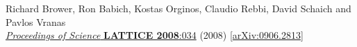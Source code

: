 \begin{spacelist}
\begin{revnumerate}
      Richard Brower, Ron Babich, Kostas Orginos, Claudio Rebbi, David Schaich and Pavlos Vranas \\
      \href{https://doi.org/10.22323/1.066.0034}{\textit{Proceedings of Science} \textbf{LATTICE 2008}:034} (2008) [\href{http://arxiv.org/abs/0906.2813}{arXiv:0906.2813}]
  \end{revnumerate}
%
%
%
\begin{comment} %
\vspace{20 pt} {\large \bfseries In active preparation} \hfill(ordered by anticipated completion)
  \pagebreakitem
    \optem{Nonperturbative ingredients for stochastic gravitational wave predictions} \\
    Venkitesh Ayyar, Ethan T.~Neil, Enrico Rinaldi and David Schaich \\
  \pagebreakitem
    \optem{Plane wave matrix model at finite temperatures on the lattice} \\
    Raghav G.~Jha, Anosh Joseph and David Schaich \\
  \pagebreakitem
    \optem{Improved parallel software for lattice supersymmetry} \\
    David Schaich, Georg Bergner, Simon Catterall, Raghav G.~Jha and Anosh Joseph \\
  \pagebreakitem
    \optem{Tests of the twelve-flavor beta function with staggered fermions} \\
    Anna Hasenfratz and David Schaich \\
  \pagebreakitem
    \optem{Lattice calculations of the $\mathcal N = 4$ supersymmetric Yang--Mills static potential} \\
    Simon Catterall, Poul H.~Damgaard, Joel Giedt, Raghav G.~Jha and David Schaich
  \pagebreakitem
    \optem{Mass anomalous dimension of many-flavor systems with staggered fermions} \\
    Anna Hasenfratz and David Schaich \\[24 pt]
  \pagebreakitem
    \optem{$\mathcal N = 4$ supersymmetric Yang--Mills anomalous dimensions from nonperturbative lattice calculations} \\
    Simon Catterall, Poul H.~Damgaard, Joel Giedt and David Schaich \\
\end{comment}
\end{spacelist}
